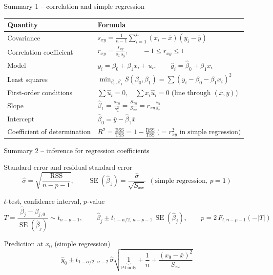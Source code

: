 \documentclass[aspectratio=169,11pt]{beamer}
\begin{document}
\begin{frame}{Summary 1 -- correlation and simple regression}
  \begin{center}
    \renewcommand{\arraystretch}{1.4}
    \begin{tabular}{l|l}
      \toprule
      \textbf{Quantity} & \textbf{Formula} \\
      \midrule
      Covariance & $s_{xy} = \frac{1}{n-1}\sum_{i=1}^{n}(x_i - \bar{x})(y_i - \bar{y})$ \\
      Correlation coefficient & $r_{xy} = \frac{s_{xy}}{s_x \, s_y}, \qquad -1 \leq r_{xy} \leq 1$ \\
      Model & $y_i = \beta_0 + \beta_1 x_i + u_i, \qquad \hat{y}_i = \hat{\beta}_0 + \hat{\beta}_1 x_i$\\
      Least squares & $\min_{\beta_0,\beta_1} S(\beta_0,\beta_1)=\sum (y_i-\beta_0-\beta_1x_i)^2$\\
      First-order conditions & $\sum\hat u_i=0,\quad \sum x_i\hat u_i=0$ \quad (line through $(\bar x,\bar y)$)\\
      Slope & $\hat{\beta}_1 = \frac{s_{xy}}{s_x^2}=\frac{S_{xy}}{S_{xx}}=r_{xy}\frac{s_y}{s_x}$ \\
      Intercept & $\hat{\beta}_0 = \bar{y} - \hat{\beta}_1 \bar{x}$ \\
      Coefficient of determination & $R^2 = \frac{\text{ESS}}{\text{TSS}} = 1 - \frac{\text{RSS}}{\text{TSS}} \;\bigl(= r_{xy}^2\text{ in simple regression}\bigr)$ \\
      \bottomrule
    \end{tabular}
  \end{center}
\end{frame}

\begin{frame}{Summary 2 -- inference for regression coefficients}
  \begin{block}{Standard error and residual standard error}
    \[
      \hat\sigma=\sqrt{\frac{\text{RSS}}{n-p-1}},\qquad
      \operatorname{SE}(\hat\beta_1)=\frac{\hat\sigma}{\sqrt{S_{xx}}}\ \ (\text{simple regression, }p=1)
    \]
  \end{block}
  \begin{block}{$t$-test, confidence interval, $p$-value}
    \[
      T=\frac{\hat\beta_j-\beta_{j,0}}{\operatorname{SE}(\hat\beta_j)}\sim t_{n-p-1},\qquad
      \hat\beta_j\pm t_{1-\alpha/2,\,n-p-1}\,\operatorname{SE}(\hat\beta_j),\qquad
      p=2\,F_{t,n-p-1}(-|T|)
    \]
  \end{block}
  \begin{block}{Prediction at $x_0$ (simple regression)}
    \[
      \hat y_0\pm t_{1-\alpha/2,\,n-2}\,\hat\sigma
      \sqrt{\underbrace{1}_{\text{PI only}}+\frac1n+\frac{(x_0-\bar x)^2}{S_{xx}}}
    \]
  \end{block}
\end{frame}
\end{document}
